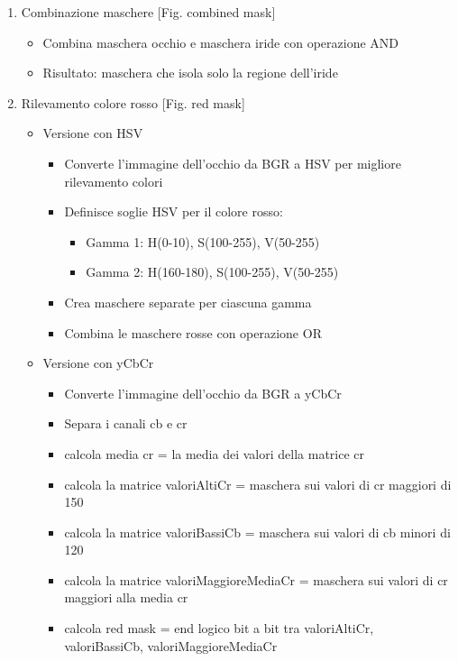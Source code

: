 \documentclass[12pt,a4paper,openright,twoside]{book}
\begin{document}
\begin{enumerate}
\begin{itemize}
    \end{itemize}
    \item Combinazione maschere [Fig. combined mask] \begin{itemize}
        \item Combina maschera occhio e maschera iride con operazione AND
        \item Risultato: maschera che isola solo la regione dell'iride
    \end{itemize}
    \item Rilevamento colore rosso [Fig. red mask] 
    \begin{itemize}
        \item Versione con HSV
            \begin{itemize}
                \item Converte l'immagine dell'occhio da BGR a HSV per migliore rilevamento colori
                \item Definisce soglie HSV per il colore rosso: \begin{itemize}
                    \item Gamma 1: H(0-10), S(100-255), V(50-255)
                    \item Gamma 2: H(160-180), S(100-255), V(50-255)
                \end{itemize}
                \item Crea maschere separate per ciascuna gamma
                \item Combina le maschere rosse con operazione OR
            \end{itemize}
        \item Versione con yCbCr
            \begin{itemize}
                \item Converte l'immagine dell'occhio da BGR a yCbCr
                \item Separa i canali cb e cr
                \item calcola media cr = la media dei valori della matrice cr
                \item calcola la matrice valoriAltiCr = maschera sui valori di cr maggiori di 150
                \item calcola la matrice valoriBassiCb = maschera sui valori di cb minori di 120
                \item calcola la matrice valoriMaggioreMediaCr = maschera sui valori di cr maggiori alla media cr
                \item calcola red mask = end logico bit a bit tra valoriAltiCr, valoriBassiCb, valoriMaggioreMediaCr

\end{itemize}
\end{itemize}
\end{enumerate}
\end{document}
